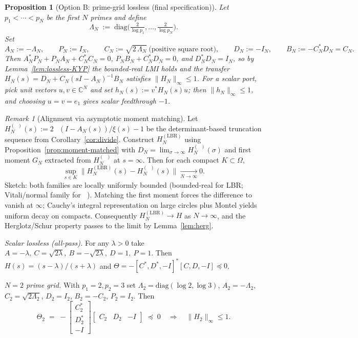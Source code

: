 \documentclass[11pt]{article}
\newtheorem{proposition}[theorem]{Proposition}
\theoremstyle{remark}
\newtheorem{remark}[theorem]{Remark}
\newcommand{\C}{\mathbb{C}}
\DeclareMathOperator{\dettwo}{det_2}
\begin{document}
\begin{proposition}[Option B: prime-grid lossless (final specification)]\label{prop:prime-grid}
Let $p_1<\cdots<p_N$ be the first $N$ primes and define
\[
 \Lambda_N\;:=\;\mathrm{diag}\!\Big(\tfrac{2}{\log p_1},\dots,\tfrac{2}{\log p_N}\Big).
\]
Set
\[
 A_N:=-\Lambda_N,\qquad P_N:=I_N,\qquad C_N:=\sqrt{2\,\Lambda_N}\ \text{(positive square root)},\qquad D_N:=-I_N,\qquad B_N:=-C_N^*D_N=C_N.
\]
Then $A_N^*P_N+P_NA_N+C_N^*C_N=0$, $P_NB_N+C_N^*D_N=0$, and $D_N^*D_N=I_N$, so by Lemma~\ref{lem:lossless-KYP} the bounded-real LMI holds and the transfer $H_N(s)=D_N+C_N(sI-A_N)^{-1}B_N$ satisfies $\|H_N\|_\infty\le 1$. For a scalar port, pick unit vectors $u,v\in\C^N$ and set $h_N(s):=v^*H_N(s)u$; then $\|h_N\|_\infty\le 1$, and choosing $u=v=e_1$ gives scalar feedthrough $-1$.
\end{proposition}

\begin{remark}[Alignment via asymptotic moment matching]\label{rem:alignment}
Let $H_N^{(\dettwo)}(s):=2\,\dettwo(I-A_N(s))/\xi(s)-1$ be the determinant-based truncation sequence from Corollary~\ref{cor:divide}. Construct $H_N^{(\mathrm{LBR})}$ using Proposition~\ref{prop:moment-matched} with $D_N=\lim_{\sigma\to\infty}H_N^{(\dettwo)}(\sigma)$ and first moment $G_N$ extracted from $H_N^{(\dettwo)}$ at $s=\infty$. Then for each compact $K\subset\Omega$,
\[
 \sup_{s\in K}\big\|H_N^{(\mathrm{LBR})}(s)-H_N^{(\dettwo)}(s)\big\|\xrightarrow[N\to\infty]{}0.
\]
Sketch: both families are locally uniformly bounded (bounded-real for LBR; Vitali/normal family for $\dettwo$). Matching the first moment forces the difference to vanish at $\infty$; Cauchy’s integral representation on large circles plus Montel yields uniform decay on compacts. Consequently $H_N^{(\mathrm{LBR})}\to H$ as $N\to\infty$, and the Herglotz/Schur property passes to the limit by Lemma~\ref{lem:herg}.
\end{remark}

\begin{example}\label{ex:toys}
\emph{Scalar lossless (all-pass).} For any $\lambda>0$ take $A=-\lambda,\ C=\sqrt{2\lambda},\ B=-\sqrt{2\lambda},\ D=1,\ P=1$. Then $H(s)=(s-\lambda)/(s+\lambda)$ and $\Theta=-[C^*,D^*,-I]^*[C,D,-I]\preceq 0$.

\emph{$N=2$ prime grid.} With $p_1=2,p_2=3$ set $\Lambda_2=\mathrm{diag}(\log 2,\log 3)$, $A_2=-\Lambda_2$, $C_2=\sqrt{2\Lambda_2}$, $D_2=I_2$, $B_2=-C_2$, $P_2=I_2$. Then
\[
 \Theta_2\;=\;-\begin{bmatrix}C_2^*\\ D_2^*\\ -I\end{bmatrix}\!\begin{bmatrix}C_2 & D_2 & -I\end{bmatrix}\;\preceq\;0\quad\Rightarrow\quad\|H_2\|_\infty\le 1.
\]
\end{example}
\end{document}
